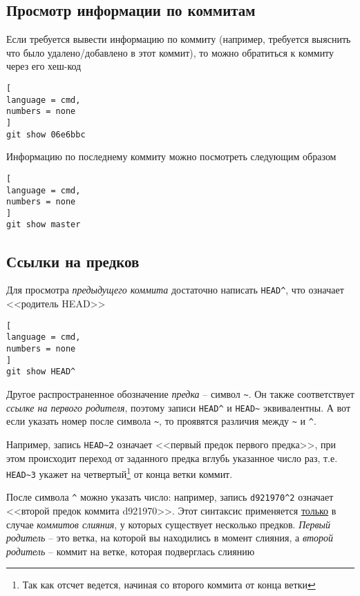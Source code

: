 \documentclass[%
	11pt,
	a4paper,
	utf8,
		]{article}
\begin{document}


\subsection{Просмотр информации по коммитам}

Если требуется вывести информацию по коммиту (например, требуется выяснить что было удалено/добавлено в этот коммит), то можно обратиться к коммиту через его хеш-код

\begin{lstlisting}[
language = cmd,
numbers = none
]
git show 06e6bbc
\end{lstlisting}

Информацию по последнему коммиту можно посмотреть следующим образом

\begin{lstlisting}[
language = cmd,
numbers = none
]
git show master
\end{lstlisting}

\subsection{Ссылки на предков}

Для просмотра \emph{предыдущего коммита} достаточно написать \texttt{HEAD\^}, что означает <<родитель HEAD>>

\begin{lstlisting}[
language = cmd,
numbers = none
]
git show HEAD^
\end{lstlisting}


Другое распространенное обозначение \emph{предка} -- символ \lstinline{~}. Он также соответствует \emph{ссылке на первого родителя}, поэтому записи \lstinline{HEAD^} и \lstinline{HEAD~} эквивалентны. А вот если указать номер после символа \lstinline{~}, то проявятся различия между \lstinline{~} и \lstinline{^}.

Например, запись \lstinline{HEAD~2} означает <<первый предок первого предка>>, при этом происходит переход от заданного предка вглубь указанное число раз, т.е. \lstinline{HEAD~3} укажет на четвертый\footnote{Так как отсчет ведется, начиная со второго коммита от конца ветки} от конца ветки коммит.

После символа \lstinline{^} можно указать число: например, запись \lstinline{d921970^2} означает <<второй предок коммита d921970>>. Этот синтаксис применяется \underline{только} в случае \emph{коммитов слияния}, у которых существует несколько предков. \emph{Первый родитель} -- это ветка, на которой вы находились в момент слияния, а \emph{второй родитель} -- коммит на ветке, которая подверглась слиянию
\end{document}
